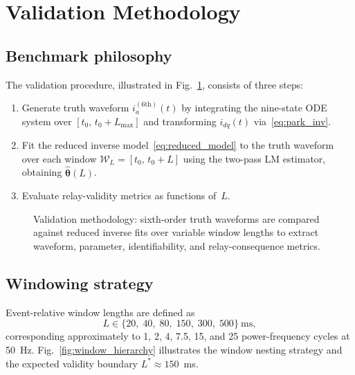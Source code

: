 \documentclass[journal,twoside,letterpaper]{IEEEtran}
\newcommand{\vect}[1]{\bm{#1}}
\begin{document}
\section{Validation Methodology}
\label{sec:methodology}

\subsection{Benchmark philosophy}

The validation procedure, illustrated in
Fig.~\ref{fig:validation_workflow}, consists of three steps:
\begin{enumerate}
  \item Generate truth waveform $i_a^{(6\text{th})}(t)$ by
    integrating the nine-state ODE system over
    $[t_0,\,t_0+L_{\max}]$ and transforming $i_{dq}(t)$
    via~\eqref{eq:park_inv}.
  \item Fit the reduced inverse model~\eqref{eq:reduced_model}
    to the truth waveform over each window
    $\mathcal{W}_L = [t_0,\,t_0+L]$ using the two-pass LM
    estimator, obtaining $\hat{\vect\theta}(L)$.
  \item Evaluate relay-validity metrics as functions
    of~$L$.
\end{enumerate}

\begin{figure}[!t]
  \centering
  
  \caption{Validation methodology: sixth-order truth waveforms
    are compared against reduced inverse fits over variable
    window lengths to extract waveform, parameter,
    identifiability, and relay-consequence metrics.}
  \label{fig:validation_workflow}
\end{figure}

\subsection{Windowing strategy}

Event-relative window lengths are defined as
\begin{equation}
  L \in \{20,\;40,\;80,\;150,\;300,\;500\}~\text{ms},
\label{eq:windows}
\end{equation}
corresponding approximately to 1, 2, 4, 7.5, 15, and 25
power-frequency cycles at 50~Hz.
Fig.~\ref{fig:window_hierarchy} illustrates the window
nesting strategy and the expected validity boundary
$L^\ast \approx 150$~ms.
\end{document}
